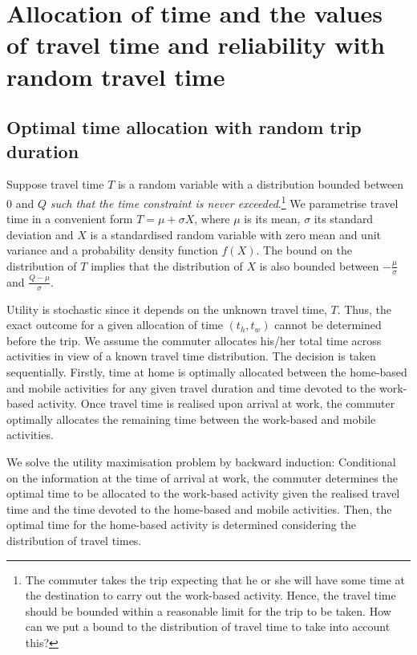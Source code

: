 \documentclass[12pt,a4paper,british]{article}
\begin{document}
\section{Allocation of time and the values of travel time and reliability with random travel time }

\subsection*{Optimal time allocation with random trip duration}

Suppose travel time $T$ is a random variable with a distribution bounded between $0$ and $Q$ \textit{such that the time constraint is never exceeded}.\footnote{The commuter takes the trip expecting that he or she will have some time at the destination to carry out the work-based activity. Hence, the travel time should be bounded within a reasonable limit for the trip to be taken. How can we put a bound to the distribution of travel time to take into account this?} We parametrise travel time in a convenient form $T=\mu+\sigma X$, where $\mu$ is its mean, $\sigma$ its standard deviation and $X$ is a standardised random variable with zero mean and unit variance and a probability density function $f\left(X\right)$. The bound on the distribution of $T$ implies that the distribution of $X$ is also bounded between $-\frac{\mu}{\sigma}$ and $\frac{Q-\mu}{\sigma}$. 

Utility is stochastic since it depends on the unknown travel time, $T$. Thus, the exact outcome for a given allocation of time $\left(t_{h},t_{w}\right)$ cannot be determined before the trip. We assume the commuter allocates his/her total time across activities in view of a known travel time distribution. The decision is taken sequentially. Firstly, time at home is optimally allocated between the home-based and mobile activities for any given travel duration and time devoted to the work-based activity. Once travel time is realised upon arrival at work, the commuter optimally allocates the remaining time between the work-based and mobile activities.

We solve the utility maximisation problem by backward induction: Conditional on the information at the time of arrival at work, the commuter determines the optimal time to be allocated to the work-based activity given the realised travel time and the time devoted to the home-based and mobile activities. Then, the optimal time for the home-based activity is determined considering the distribution of travel times.
\end{document}
